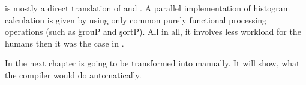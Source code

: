     \ndpn is mostly a direct translation of \seq and \algo.
    A parallel implementation of histogram calculation is given
    by using only common purely functional processing operations (such as \c{grouP} and \c{sortP}).
    All in all, it involves less workload for the humans then it was
    the case in \man.
    
    
    In the next chapter \ndpn is going to be transformed into \ndpv
    manually. It will show, what the compiler would do automatically.
  
  
      
    
  
